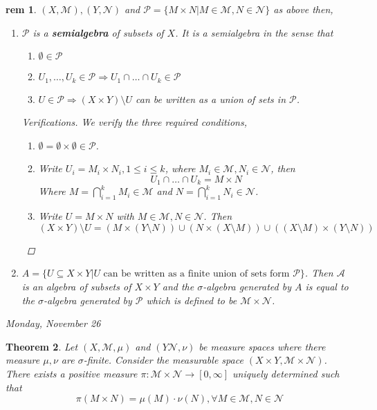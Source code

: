 \documentclass[letterpaper, 12pt]{article}
\newcommand{\fin}{\qquad \quad \hfill \framebox[1.75mm][l]{\,}}
\newcommand{\cM}{\mathcal{M}}
\newcommand{\cN}{\mathcal{N}}
\newcommand{\cP}{\mathcal{P}}
\newcommand{\sA}{\mathcal{A}}
\theoremstyle{stdthm}
\newtheorem{thm}{Theorem}[section]
\theoremstyle{stddef}
\newtheorem{rem}[thm]{rem} %
\theoremstyle{stdnonum}
\theoremstyle{stdqands}
\theoremstyle{stdbold}
\begin{document}
\begin{rem}
$(X,\cM),(Y,\cN)$ and $\cP = \{M \times N| M \in \cM, N \in \cN\}$ as above then, 
\begin{enumerate}
\item $\cP$ is a {\bf semialgebra} of subsets of $X$. It is a semialgebra in the sense that 
\begin{enumerate}
\item $\emptyset \in \cP$
\item $U_1,\dots, U_k \in \cP \Rightarrow U_1 \cap \dots \cap U_k \in \cP$
\item $U \in \cP \Rightarrow (X\times Y)\setminus U$ can be written as a union of sets in $\cP$. 
\end{enumerate}
\begin{proof}[Verifications]
We verify the three required conditions, 


\begin{enumerate}
\item $\emptyset = \emptyset \times  \emptyset \in \cP$. 
\item Write $U_i = M_i \times N_i, 1 \leq i \leq k$, where $M_i \in \cM, N_i \in \cN$, then 
\[ U_1 \cap \dots \cap U_k = M \times N \]
Where $M = \bigcap_{i=1}^k M_i \in \cM$ and $N = \bigcap_{i=1}^k N_i \in \cN$. 
\item Write $U = M \times N$ with $M \in \cM, N \in \cN$. Then 
\[ (X\times Y) \setminus U = (M \times (Y \setminus N)) \cup (N \times (X \setminus M)) \cup ((X \setminus M) \times (Y \setminus N)) \]
\end{enumerate}

\end{proof}

\item $A = \{U \subseteq X \times Y| U \mbox{ can be written as a finite union of sets form }\cP\}$. Then $\sA$ is an algebra of subsets of $X \times Y$ and the $\sigma$-algebra generated by $A$ is equal to the $\sigma$-algebra generated by $\cP$ which is defined to be $\cM \times \cN$. 

\end{enumerate}

\end{rem}

\begin{center}
\emph{Monday, November 26}
\end{center}

\begin{thm}
Let $(X,\cM,\mu)$ and $(Y \cN,\nu)$ be measure spaces where there measure $\mu,\nu$ are $\sigma$-finite. Consider the measurable space $(X\times Y, \cM \times \cN)$. There exists a positive measure $\pi: \cM \times \cN \to [0,\infty]$ uniquely determined such that 
\[ \pi(M \times N) = \mu(M)\cdot \nu(N), \forall M \in \cM, N \in \cN \]
\end{thm}
\end{document}
